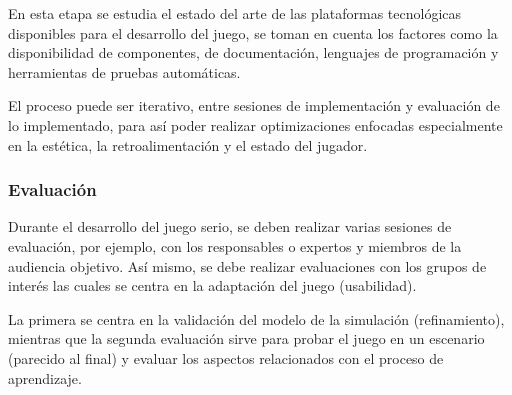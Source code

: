 En esta etapa se estudia el estado del arte de las plataformas tecnológicas disponibles para el desarrollo del juego, se toman en cuenta los factores como la disponibilidad de componentes, de documentación, lenguajes de programación y herramientas de pruebas automáticas.

El proceso puede ser iterativo, entre sesiones de implementación y evaluación de lo implementado, para así poder realizar optimizaciones enfocadas especialmente en la estética, la retroalimentación y el estado del jugador.

\subsubsection{Evaluación} 

Durante el desarrollo del juego serio, se deben realizar varias sesiones de evaluación, por ejemplo, con los responsables o expertos y miembros de la audiencia objetivo. Así mismo, se debe realizar evaluaciones con los grupos de interés las cuales se centra en la adaptación del juego (usabilidad). 

La primera se centra en la validación del modelo de la simulación (refinamiento), mientras que la segunda evaluación sirve para probar el juego en un escenario (parecido al final) y evaluar los aspectos relacionados con el proceso de aprendizaje.  